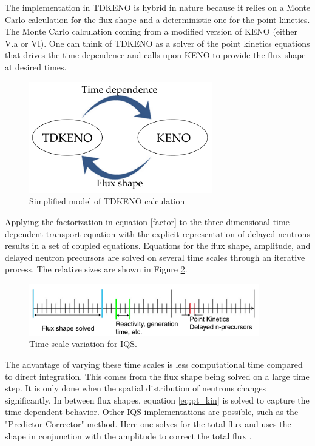 \documentclass[11pt]{article}
\begin{document}
 The implementation in TDKENO is hybrid in nature because it relies on a Monte Carlo calculation for the flux shape and a deterministic one for the point kinetics.  The Monte Carlo calculation coming from a modified version of KENO (either V.a or VI).  One can think of TDKENO as a solver of the point kinetics equations that drives the time dependence and calls upon KENO to provide the flux shape at desired times. 
 \begin{figure}[h]
     \centering
     \includegraphics[width=8cm]{figures/tdkeno_flow.pdf}
     \caption{Simplified model of TDKENO calculation}
     \label{fig:simpletdk}
 \end{figure}

Applying the factorization in equation \ref{factor} to the three-dimensional time-dependent transport equation with the explicit representation of delayed neutrons results in a set of coupled equations.  Equations for the flux shape, amplitude, and delayed neutron precursors are solved on several time scales through an iterative process. The relative sizes are shown in Figure \ref{fig:time_scale}. 

\begin{figure}[h]
    \centering
    \includegraphics[width=10cm]{figures/time_scale.pdf}
    \caption{Time scale variation for IQS.}
    \label{fig:time_scale}
\end{figure}

The advantage of varying these time scales is less computational time compared to direct integration.  This comes from the flux shape being solved on a large time step. It is only done when the spatial distribution of neutrons changes significantly.  In between flux shapes, equation \ref{eq:pt_kin} is solved to capture the time dependent behavior.  Other IQS implementations are possible, such as the "Predictor Corrector" method.  Here one solves for the total flux and uses the shape in conjunction with the amplitude to correct the total flux \cite{Dulla}.  
\end{document}
